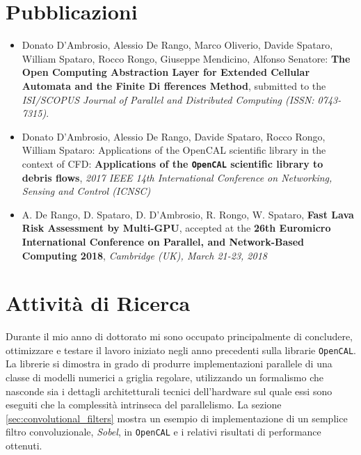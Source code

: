 \section{Pubblicazioni}
\begin{itemize}
	\item  Donato D'Ambrosio, Alessio De Rango, Marco Oliverio, Davide Spataro,
	William Spataro, Rocco Rongo, Giuseppe Mendicino, Alfonso Senatore:
	\textbf{The Open Computing Abstraction Layer for Extended Cellular
	Automata and the Finite Di fferences Method}, submitted to
	the \textit{ISI/SCOPUS Journal of Parallel and Distributed Computing (ISSN:
	0743-7315)}.

\item Donato D'Ambrosio, Alessio De Rango, Davide Spataro, Rocco Rongo,
William Spataro: Applications of the OpenCAL scientific library in
the context of CFD: \textbf{Applications of the \texttt{OpenCAL} scientific library to debris flows}, \textit{2017 IEEE 14th
International Conference on Networking, Sensing and Control (ICNSC)}

\item A. De Rango, D. Spataro, D. D’Ambrosio, R. Rongo, W. Spataro, \textbf{Fast
Lava Risk Assessment by Multi-GPU}, accepted at the \textbf{26th Euromicro
International Conference on Parallel, and Network-Based Computing
2018}, \textit{Cambridge (UK), March 21-23, 2018}

\end{itemize}


\section{Attività di Ricerca}
Durante il mio  anno di dottorato mi sono occupato principalmente di concludere, ottimizzare e testare il lavoro iniziato negli anno precedenti sulla librarie \texttt{OpenCAL}. La librerie si dimostra in grado di produrre implementazioni parallele di una classe di modelli numerici a griglia regolare, utilizzando un formalismo che nasconde sia i dettagli architetturali tecnici dell'hardware sul quale essi sono eseguiti che la complessità intrinseca del parallelismo.
La sezione \ref{sec:convolutional_filters} mostra un esempio di implementazione di un semplice filtro convoluzionale, \textit{Sobel}, in \texttt{OpenCAL} e i relativi risultati di performance ottenuti.

